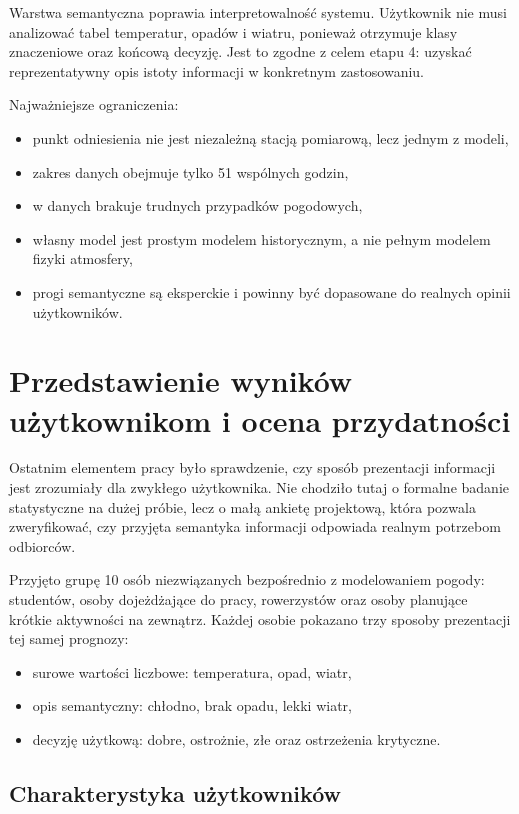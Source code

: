 \documentclass[a4paper,12pt]{article}
\begin{document}
Warstwa semantyczna poprawia interpretowalność systemu. Użytkownik nie musi
analizować tabel temperatur, opadów i wiatru, ponieważ otrzymuje klasy
znaczeniowe oraz końcową decyzję. Jest to zgodne z celem etapu 4: uzyskać
reprezentatywny opis istoty informacji w konkretnym zastosowaniu.

\noindent
Najważniejsze ograniczenia:
\begin{itemize}
    \item punkt odniesienia nie jest niezależną stacją pomiarową, lecz jednym z modeli,
    \item zakres danych obejmuje tylko 51 wspólnych godzin,
    \item w danych brakuje trudnych przypadków pogodowych,
    \item własny model jest prostym modelem historycznym, a nie pełnym modelem fizyki atmosfery,
    \item progi semantyczne są eksperckie i powinny być dopasowane do realnych opinii użytkowników.
\end{itemize}


\section{Przedstawienie wyników użytkownikom i ocena przydatności}

Ostatnim elementem pracy było sprawdzenie, czy sposób prezentacji informacji
jest zrozumiały dla zwykłego użytkownika. Nie chodziło tutaj o formalne badanie
statystyczne na dużej próbie, lecz o małą ankietę projektową, która pozwala
zweryfikować, czy przyjęta semantyka informacji odpowiada realnym potrzebom
odbiorców.

\noindent
Przyjęto grupę 10 osób niezwiązanych bezpośrednio z modelowaniem pogody:
studentów, osoby dojeżdżające do pracy, rowerzystów oraz osoby planujące
krótkie aktywności na zewnątrz. Każdej osobie pokazano trzy sposoby prezentacji
tej samej prognozy:
\begin{itemize}
    \item surowe wartości liczbowe: temperatura, opad, wiatr,
    \item opis semantyczny: chłodno, brak opadu, lekki wiatr,
    \item decyzję użytkową: dobre, ostrożnie, złe oraz ostrzeżenia krytyczne.
\end{itemize}

\subsection{Charakterystyka użytkowników}
\end{document}
